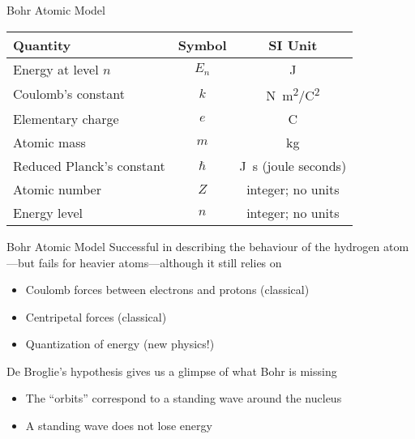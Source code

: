 \documentclass[12pt,compress,aspectratio=169]{beamer}
\newcommand{\eq}[2]{\vspace{#1}{\Large\begin{displaymath}#2\end{displaymath}}}
\begin{document}
\begin{frame}{Bohr Atomic Model}
  \eq{-.1in}{
    \boxed{E_n=-\frac{k^2e^4m}{2\hbar^2}\frac{Z^2}{n^2}}
  }
  \begin{center}
    \begin{tabular}{l|c|c}
      \rowcolor{pink}
      \textbf{Quantity} & \textbf{Symbol} & \textbf{SI Unit} \\ \hline
      Energy at level $n$ & $E_n$ & \si{\joule} \\
      Coulomb's constant & $k$ & \si{N.m^2/C^2} \\
      Elementary charge  & $e$ & \si{\coulomb} \\
      Atomic mass        & $m$ & \si{\kilo\gram} \\
      Reduced Planck's constant & $\hbar$ & \si{\joule.\second}
      (joule seconds)\\
      Atomic number      & $Z$ & integer; no units\\
      Energy level       & $n$ & integer; no units
    \end{tabular}
  \end{center}
\end{frame}


\begin{frame}{Bohr Atomic  Model}
  Successful in describing the behaviour of the hydrogen atom---but fails for
  heavier atoms---although it still relies on 
  \begin{itemize}
  \item Coulomb forces between electrons and protons (classical)
  \item Centripetal forces (classical)
  \item Quantization of energy (new physics!)
  \end{itemize}
  De Broglie's hypothesis gives us a glimpse of what Bohr is missing
  \begin{itemize}
  \item The ``orbits'' correspond to a standing wave around the nucleus
  \item A standing wave does not lose energy
  \end{itemize}
\end{frame}
\end{document}
